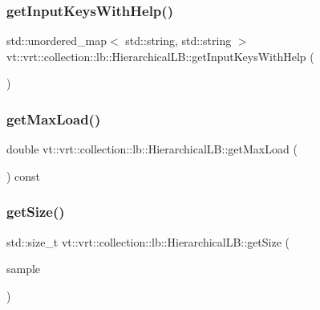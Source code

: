 \subsubsection{\texorpdfstring{get\+Input\+Keys\+With\+Help()}{getInputKeysWithHelp()}}
{\footnotesize\ttfamily std\+::unordered\+\_\+map$<$ std\+::string, std\+::string $>$ vt\+::vrt\+::collection\+::lb\+::\+Hierarchical\+L\+B\+::get\+Input\+Keys\+With\+Help (\begin{DoxyParamCaption}{ }\end{DoxyParamCaption})\hspace{0.3cm}{\ttfamily [static]}}

\mbox{\label{structvt_1_1vrt_1_1collection_1_1lb_1_1_hierarchical_l_b_a32428a4c65c820d846e398270578d986}} 
\subsubsection{\texorpdfstring{get\+Max\+Load()}{getMaxLoad()}}
{\footnotesize\ttfamily double vt\+::vrt\+::collection\+::lb\+::\+Hierarchical\+L\+B\+::get\+Max\+Load (\begin{DoxyParamCaption}{ }\end{DoxyParamCaption}) const\hspace{0.3cm}{\ttfamily [private]}}

\mbox{\label{structvt_1_1vrt_1_1collection_1_1lb_1_1_hierarchical_l_b_ab895082b639e196f5a128785c7b9bdda}} 
\subsubsection{\texorpdfstring{get\+Size()}{getSize()}}
{\footnotesize\ttfamily std\+::size\+\_\+t vt\+::vrt\+::collection\+::lb\+::\+Hierarchical\+L\+B\+::get\+Size (\begin{DoxyParamCaption}\item[{\hyperlink{structvt_1_1vrt_1_1collection_1_1lb_1_1_load_sampler_base_l_b_a8d939a849ec0d6371c1c4d441ffb9b94}{Obj\+Sample\+Type} const \&}]{sample }\end{DoxyParamCaption})\hspace{0.3cm}{\ttfamily [private]}}

